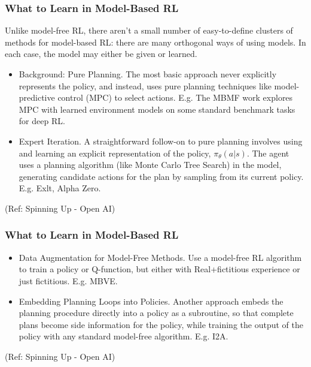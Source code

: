 \begin{frame}[fragile]\frametitle{What to Learn in Model-Based RL}

Unlike model-free RL, there aren't a small number of easy-to-define clusters of methods for model-based RL: there are many orthogonal ways of using models.  In each case, the model may either be given or learned.

\begin{itemize}
\item Background: Pure Planning. The most basic approach never explicitly represents the policy, and instead, uses pure planning techniques like model-predictive control (MPC) to select actions. E.g. The MBMF work explores MPC with learned environment models on some standard benchmark tasks for deep RL.
\item Expert Iteration. A straightforward follow-on to pure planning involves using and learning an explicit representation of the policy, $\pi_{\theta}(a|s)$. The agent uses a planning algorithm (like Monte Carlo Tree Search) in the model, generating candidate actions for the plan by sampling from its current policy. E.g. Exlt, Alpha Zero.
\end{itemize}

{\tiny (Ref: Spinning Up - Open AI)}
\end{frame}

\begin{frame}[fragile]\frametitle{What to Learn in Model-Based RL}


\begin{itemize}
\item Data Augmentation for Model-Free Methods. Use a model-free RL algorithm to train a policy or Q-function, but either with Real+fictitious experience or just fictitious. E.g. MBVE.
\item Embedding Planning Loops into Policies. Another approach embeds the planning procedure directly into a policy as a subroutine, so that complete plans become side information for the policy, while training the output of the policy with any standard model-free algorithm. E.g. I2A.
\end{itemize}

{\tiny (Ref: Spinning Up - Open AI)}
\end{frame}

